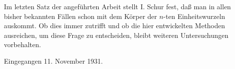 Im letzten Satz der angeführten Arbeit stellt I. Schur fest, daß man in allen bisher bekannten Fällen schon mit dem Körper der \(n\)-ten Einheitswurzeln auskommt. Ob dies immer zutrifft und ob die hier entwickelten Methoden ausreichen, um diese Frage zu entscheiden, bleibt weiteren Untersuchungen vorbehalten.

\begin{center}
Eingegangen 11. November 1931.
\end{center}

\clearpage

\setcounter{footnote}{0}

